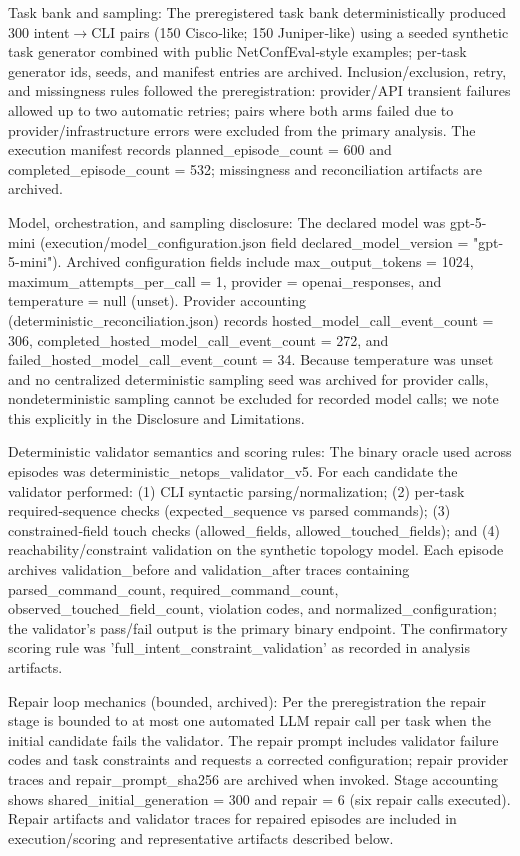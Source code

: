 \documentclass[conference]{IEEEtran}
\begin{document}
Task bank and sampling: The preregistered task bank deterministically produced 300 intent\ensuremath{\rightarrow}CLI pairs (150 Cisco‑like; 150 Juniper‑like) using a seeded synthetic task generator combined with public NetConfEval‑style examples; per‑task generator ids, seeds, and manifest entries are archived. Inclusion/exclusion, retry, and missingness rules followed the preregistration: provider/API transient failures allowed up to two automatic retries; pairs where both arms failed due to provider/infrastructure errors were excluded from the primary analysis. The execution manifest records planned\_episode\_count = 600 and completed\_episode\_count = 532; missingness and reconciliation artifacts are archived.

Model, orchestration, and sampling disclosure: The declared model was gpt-5-mini (execution/model\_configuration.json field declared\_model\_version = "gpt-5-mini"). Archived configuration fields include max\_output\_tokens = 1024, maximum\_attempts\_per\_call = 1, provider = openai\_responses, and temperature = null (unset). Provider accounting (deterministic\_reconciliation.json) records hosted\_model\_call\_event\_count = 306, completed\_hosted\_model\_call\_event\_count = 272, and failed\_hosted\_model\_call\_event\_count = 34. Because temperature was unset and no centralized deterministic sampling seed was archived for provider calls, nondeterministic sampling cannot be excluded for recorded model calls; we note this explicitly in the Disclosure and Limitations.

Deterministic validator semantics and scoring rules: The binary oracle used across episodes was deterministic\_netops\_validator\_v5. For each candidate the validator performed: (1) CLI syntactic parsing/normalization; (2) per‑task required‑sequence checks (expected\_sequence vs parsed commands); (3) constrained‑field touch checks (allowed\_fields, allowed\_touched\_fields); and (4) reachability/constraint validation on the synthetic topology model. Each episode archives validation\_before and validation\_after traces containing parsed\_command\_count, required\_command\_count, observed\_touched\_field\_count, violation codes, and normalized\_configuration; the validator's pass/fail output is the primary binary endpoint. The confirmatory scoring rule was 'full\_intent\_constraint\_validation' as recorded in analysis artifacts.

Repair loop mechanics (bounded, archived): Per the preregistration the repair stage is bounded to at most one automated LLM repair call per task when the initial candidate fails the validator. The repair prompt includes validator failure codes and task constraints and requests a corrected configuration; repair provider traces and repair\_prompt\_sha256 are archived when invoked. Stage accounting shows shared\_initial\_generation = 300 and repair = 6 (six repair calls executed). Repair artifacts and validator traces for repaired episodes are included in execution/scoring and representative artifacts described below.
\end{document}
